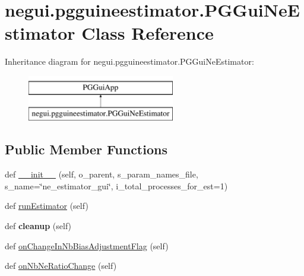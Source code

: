 \hypertarget{classnegui_1_1pgguineestimator_1_1PGGuiNeEstimator}{}\section{negui.\+pgguineestimator.\+P\+G\+Gui\+Ne\+Estimator Class Reference}
\label{classnegui_1_1pgguineestimator_1_1PGGuiNeEstimator}
Inheritance diagram for negui.\+pgguineestimator.\+P\+G\+Gui\+Ne\+Estimator\+:\begin{figure}[H]
\begin{center}
\leavevmode
\includegraphics[height=2.000000cm]{classnegui_1_1pgguineestimator_1_1PGGuiNeEstimator}
\end{center}
\end{figure}
\subsection*{Public Member Functions}
\begin{DoxyCompactItemize}
\item 
def \hyperlink{classnegui_1_1pgguineestimator_1_1PGGuiNeEstimator_ab2706976b4516b9b82409844d81bf436}{\+\_\+\+\_\+init\+\_\+\+\_\+} (self, o\+\_\+parent, s\+\_\+param\+\_\+names\+\_\+file, s\+\_\+name=\char`\"{}ne\+\_\+estimator\+\_\+gui\char`\"{}, i\+\_\+total\+\_\+processes\+\_\+for\+\_\+est=1)
\item 
def \hyperlink{classnegui_1_1pgguineestimator_1_1PGGuiNeEstimator_aa1ee1f0041f2dcce74e3e3ead41c9491}{run\+Estimator} (self)
\item 
def {\bfseries cleanup} (self)\hypertarget{classnegui_1_1pgguineestimator_1_1PGGuiNeEstimator_a225ca14b688f79ed2b393724e5826a4c}{}\label{classnegui_1_1pgguineestimator_1_1PGGuiNeEstimator_a225ca14b688f79ed2b393724e5826a4c}

\item 
def \hyperlink{classnegui_1_1pgguineestimator_1_1PGGuiNeEstimator_afe51feb1cba7881b61daa2413a329ef8}{on\+Change\+In\+Nb\+Bias\+Adjustment\+Flag} (self)
\item 
def \hyperlink{classnegui_1_1pgguineestimator_1_1PGGuiNeEstimator_a4e58291695dd65dd44a2f10e2bd2ee6c}{on\+Nb\+Ne\+Ratio\+Change} (self)
\end{DoxyCompactItemize}
